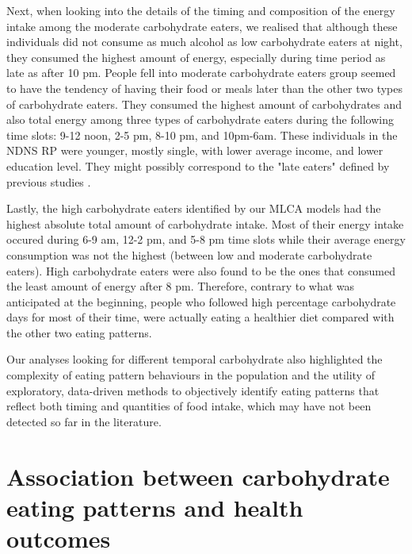 Next, when looking into the details of the timing and composition of the energy intake among the moderate carbohydrate eaters, we realised that although these individuals did not consume as much alcohol as low carbohydrate eaters at night, they consumed the highest amount of energy, especially during time period as late as after 10 pm. People fell into moderate carbohydrate eaters group seemed to have the tendency of having their food or meals later than the other two types of carbohydrate eaters. They consumed the highest amount of carbohydrates and also total energy among three types of carbohydrate eaters during the following time slots: 9-12 noon, 2-5 pm, 8-10 pm, and 10pm-6am. These individuals in the NDNS RP were younger, mostly single, with lower average income, and lower education level. They might possibly correspond to the "late eaters" defined by previous studies \parencite{leech2017temporal, mansukhani2018investigating}. 

Lastly, the high carbohydrate eaters identified by our MLCA models had the highest absolute total amount of carbohydrate intake. Most of their energy intake occured during 6-9 am, 12-2 pm, and 5-8 pm time slots while their average energy consumption was not the highest (between low and moderate carbohydrate eaters). High carbohydrate eaters were also found to be the ones that consumed the least amount of energy after 8 pm. Therefore, contrary to what was anticipated at the beginning, people who followed high percentage carbohydrate days for most of their time, were actually eating a healthier diet compared with the other two eating patterns. 

Our analyses looking for different temporal carbohydrate also highlighted the complexity of eating pattern behaviours in the population and the utility of exploratory, data-driven methods to objectively identify eating patterns that reflect both timing and quantities of food intake, which may have not been detected so far in the literature.


\section{Association between carbohydrate eating patterns and health outcomes}

